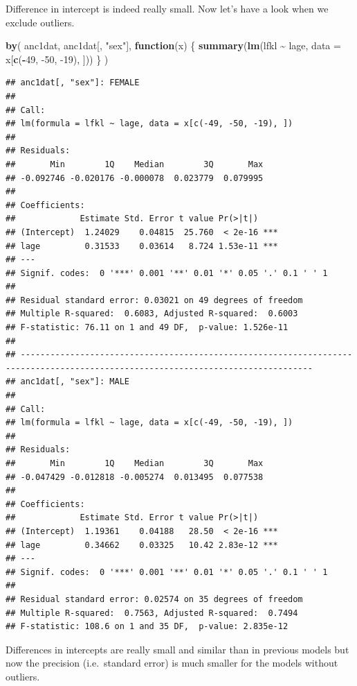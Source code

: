 \documentclass[
  12pt,
]{book}
\newenvironment{Shaded}{\begin{snugshade}}{\end{snugshade}}
\newcommand{\ControlFlowTok}[1]{\textcolor[rgb]{0.13,0.29,0.53}{\textbf{#1}}}
\newcommand{\DataTypeTok}[1]{\textcolor[rgb]{0.13,0.29,0.53}{#1}}
\newcommand{\DecValTok}[1]{\textcolor[rgb]{0.00,0.00,0.81}{#1}}
\newcommand{\KeywordTok}[1]{\textcolor[rgb]{0.13,0.29,0.53}{\textbf{#1}}}
\newcommand{\NormalTok}[1]{#1}
\newcommand{\OperatorTok}[1]{\textcolor[rgb]{0.81,0.36,0.00}{\textbf{#1}}}
\newcommand{\StringTok}[1]{\textcolor[rgb]{0.31,0.60,0.02}{#1}}
\begin{document}
Difference in intercept is indeed really small. Now let's have a look when we exclude outliers.

\begin{Shaded}
\begin{Highlighting}[]
\KeywordTok{by}\NormalTok{(}
\NormalTok{  anc1dat,}
\NormalTok{  anc1dat[, }\StringTok{"sex"}\NormalTok{],}
  \ControlFlowTok{function}\NormalTok{(x) \{}
    \KeywordTok{summary}\NormalTok{(}\KeywordTok{lm}\NormalTok{(lfkl }\OperatorTok{\textasciitilde{}}\StringTok{ }\NormalTok{lage, }\DataTypeTok{data =}\NormalTok{ x[}\KeywordTok{c}\NormalTok{(}\OperatorTok{{-}}\DecValTok{49}\NormalTok{, }\DecValTok{{-}50}\NormalTok{, }\DecValTok{{-}19}\NormalTok{), ]))}
\NormalTok{  \}}
\NormalTok{)}
\end{Highlighting}
\end{Shaded}

\begin{verbatim}
## anc1dat[, "sex"]: FEMALE      
## 
## Call:
## lm(formula = lfkl ~ lage, data = x[c(-49, -50, -19), ])
## 
## Residuals:
##       Min        1Q    Median        3Q       Max 
## -0.092746 -0.020176 -0.000078  0.023779  0.079995 
## 
## Coefficients:
##             Estimate Std. Error t value Pr(>|t|)    
## (Intercept)  1.24029    0.04815  25.760  < 2e-16 ***
## lage         0.31533    0.03614   8.724 1.53e-11 ***
## ---
## Signif. codes:  0 '***' 0.001 '**' 0.01 '*' 0.05 '.' 0.1 ' ' 1
## 
## Residual standard error: 0.03021 on 49 degrees of freedom
## Multiple R-squared:  0.6083, Adjusted R-squared:  0.6003 
## F-statistic: 76.11 on 1 and 49 DF,  p-value: 1.526e-11
## 
## --------------------------------------------------------------------------------------------------------------------------------- 
## anc1dat[, "sex"]: MALE        
## 
## Call:
## lm(formula = lfkl ~ lage, data = x[c(-49, -50, -19), ])
## 
## Residuals:
##       Min        1Q    Median        3Q       Max 
## -0.047429 -0.012818 -0.005274  0.013495  0.077538 
## 
## Coefficients:
##             Estimate Std. Error t value Pr(>|t|)    
## (Intercept)  1.19361    0.04188   28.50  < 2e-16 ***
## lage         0.34662    0.03325   10.42 2.83e-12 ***
## ---
## Signif. codes:  0 '***' 0.001 '**' 0.01 '*' 0.05 '.' 0.1 ' ' 1
## 
## Residual standard error: 0.02574 on 35 degrees of freedom
## Multiple R-squared:  0.7563, Adjusted R-squared:  0.7494 
## F-statistic: 108.6 on 1 and 35 DF,  p-value: 2.835e-12
\end{verbatim}

Differences in intercepts are really small and similar than in previous models but now the precision (i.e.~standard error) is much smaller for the models without outliers.
\end{document}
